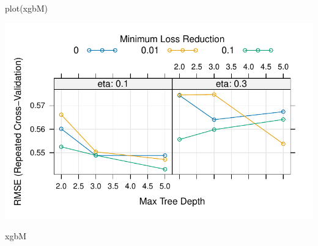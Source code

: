 \documentclass[
  letterpaper,
  DIV=11,
  numbers=noendperiod]{scrreprt}
\newenvironment{Shaded}{\begin{snugshade}}{\end{snugshade}}
\newcommand{\FunctionTok}[1]{\textcolor[rgb]{0.28,0.35,0.67}{#1}}
\newcommand{\NormalTok}[1]{\textcolor[rgb]{0.00,0.23,0.31}{#1}}
\begin{document}
\begin{Shaded}
\begin{Highlighting}[]
\FunctionTok{plot}\NormalTok{(xgbM)}
\end{Highlighting}
\end{Shaded}

\includegraphics{03_HyperparameterTuning_files/figure-pdf/unnamed-chunk-7-2.pdf}

\begin{Shaded}
\begin{Highlighting}[]
\NormalTok{xgbM}
\end{Highlighting}
\end{Shaded}
\end{document}
